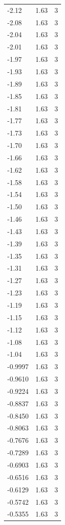 \begin{longtable}{lrr}
  -2.12 & 1.63 & 3 \\
  -2.08 & 1.63 & 3 \\
  -2.04 & 1.63 & 3 \\
  -2.01 & 1.63 & 3 \\
  -1.97 & 1.63 & 3 \\
  -1.93 & 1.63 & 3 \\
  -1.89 & 1.63 & 3 \\
  -1.85 & 1.63 & 3 \\
  -1.81 & 1.63 & 3 \\
  -1.77 & 1.63 & 3 \\
  -1.73 & 1.63 & 3 \\
  -1.70 & 1.63 & 3 \\
  -1.66 & 1.63 & 3 \\
  -1.62 & 1.63 & 3 \\
  -1.58 & 1.63 & 3 \\
  -1.54 & 1.63 & 3 \\
  -1.50 & 1.63 & 3 \\
  -1.46 & 1.63 & 3 \\
  -1.43 & 1.63 & 3 \\
  -1.39 & 1.63 & 3 \\
  -1.35 & 1.63 & 3 \\
  -1.31 & 1.63 & 3 \\
  -1.27 & 1.63 & 3 \\
  -1.23 & 1.63 & 3 \\
  -1.19 & 1.63 & 3 \\
  -1.15 & 1.63 & 3 \\
  -1.12 & 1.63 & 3 \\
  -1.08 & 1.63 & 3 \\
  -1.04 & 1.63 & 3 \\
  -0.9997 & 1.63 & 3 \\
  -0.9610 & 1.63 & 3 \\
  -0.9224 & 1.63 & 3 \\
  -0.8837 & 1.63 & 3 \\
  -0.8450 & 1.63 & 3 \\
  -0.8063 & 1.63 & 3 \\
  -0.7676 & 1.63 & 3 \\
  -0.7289 & 1.63 & 3 \\
  -0.6903 & 1.63 & 3 \\
  -0.6516 & 1.63 & 3 \\
  -0.6129 & 1.63 & 3 \\
  -0.5742 & 1.63 & 3 \\
  -0.5355 & 1.63 & 3 \\

\end{longtable}

